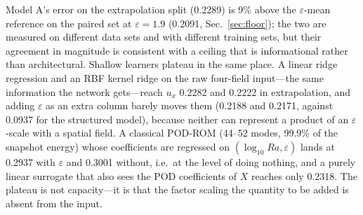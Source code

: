\documentclass[preprint,11pt,a4paper,times,doubleblind]{elsarticle}
\begin{document}
Model A's error on the extrapolation split (0.2289) is 9\% above the $\varepsilon$-mean reference
on the paired set at $\varepsilon=1.9$ (0.2091, Sec.~\ref{sec:floor}); the two are measured on
different data sets and with different training sets, but their agreement in magnitude is
consistent with a ceiling that is informational rather than architectural. Shallow learners plateau in
the same place. A linear ridge regression and an RBF kernel ridge on the raw four-field
input---the same information the network gets---reach $u_x$ 0.2282 and 0.2222 in extrapolation, and
adding $\varepsilon$ as an extra column barely moves them (0.2188 and 0.2171, against 0.0937 for
the structured model), because neither can represent a product of an $\varepsilon$-scale with a
spatial field. A classical POD-ROM (44--52 modes, 99.9\% of the snapshot energy) whose coefficients
are regressed on $(\log_{10}Ra,\varepsilon)$ lands at 0.2937 with $\varepsilon$ and 0.3001 without,
i.e.\ at the level of doing nothing, and a purely linear surrogate that also sees the POD
coefficients of $X$ reaches only 0.2318. The plateau is not capacity---it is that the factor
scaling the quantity to be added is absent from the input.
\end{document}

